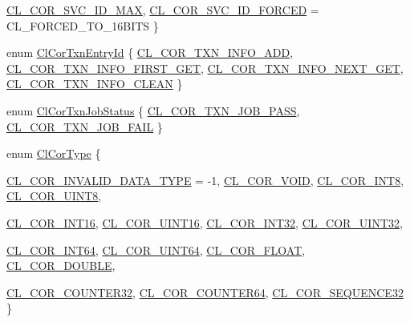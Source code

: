 \begin{CompactItemize}
\hyperlink{group__group13_gga339a6}{CL\_\-COR\_\-SVC\_\-ID\_\-MAX}, 
\hyperlink{group__group13_gga339a7}{CL\_\-COR\_\-SVC\_\-ID\_\-FORCED} =  CL\_\-FORCED\_\-TO\_\-16BITS
 \}
\item 
enum \hyperlink{group__group13_ga338}{Cl\-Cor\-Txn\-Entry\-Id} \{ \hyperlink{group__group13_gga338a169}{CL\_\-COR\_\-TXN\_\-INFO\_\-ADD}, 
\hyperlink{group__group13_gga338a170}{CL\_\-COR\_\-TXN\_\-INFO\_\-FIRST\_\-GET}, 
\hyperlink{group__group13_gga338a171}{CL\_\-COR\_\-TXN\_\-INFO\_\-NEXT\_\-GET}, 
\hyperlink{group__group13_gga338a172}{CL\_\-COR\_\-TXN\_\-INFO\_\-CLEAN}
 \}
\item 
enum \hyperlink{group__group13_ga334}{Cl\-Cor\-Txn\-Job\-Status} \{ \hyperlink{group__group13_gga334a151}{CL\_\-COR\_\-TXN\_\-JOB\_\-PASS}, 
\hyperlink{group__group13_gga334a152}{CL\_\-COR\_\-TXN\_\-JOB\_\-FAIL}
 \}
\item 
enum \hyperlink{group__group13_ga325}{Cl\-Cor\-Type} \{ \par
\hyperlink{group__group13_gga325a99}{CL\_\-COR\_\-INVALID\_\-DATA\_\-TYPE} =  -1, 
\hyperlink{group__group13_gga325a100}{CL\_\-COR\_\-VOID}, 
\hyperlink{group__group13_gga325a101}{CL\_\-COR\_\-INT8}, 
\hyperlink{group__group13_gga325a102}{CL\_\-COR\_\-UINT8}, 
\par
\hyperlink{group__group13_gga325a103}{CL\_\-COR\_\-INT16}, 
\hyperlink{group__group13_gga325a104}{CL\_\-COR\_\-UINT16}, 
\hyperlink{group__group13_gga325a105}{CL\_\-COR\_\-INT32}, 
\hyperlink{group__group13_gga325a106}{CL\_\-COR\_\-UINT32}, 
\par
\hyperlink{group__group13_gga325a107}{CL\_\-COR\_\-INT64}, 
\hyperlink{group__group13_gga325a108}{CL\_\-COR\_\-UINT64}, 
\hyperlink{group__group13_gga325a109}{CL\_\-COR\_\-FLOAT}, 
\hyperlink{group__group13_gga325a110}{CL\_\-COR\_\-DOUBLE}, 
\par
\hyperlink{group__group13_gga325a111}{CL\_\-COR\_\-COUNTER32}, 
\hyperlink{group__group13_gga325a112}{CL\_\-COR\_\-COUNTER64}, 
\hyperlink{group__group13_gga325a113}{CL\_\-COR\_\-SEQUENCE32}
 \}
\end{CompactItemize}
